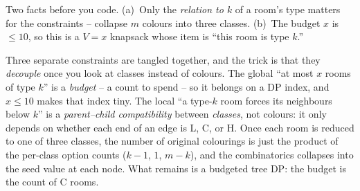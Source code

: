 \begin{attemptgate}
Two facts before you code. (a)~Only the \emph{relation to $k$} of a room's
type matters for the constraints -- collapse $m$ colours into three classes.
(b)~The budget $x$ is $\le 10$, so this is a $V=x$ knapsack whose item is
``this room is type $k$.''
\end{attemptgate}

Three separate constraints are tangled together, and the trick is that they
\emph{decouple} once you look at classes instead of colours. The global
``at most $x$ rooms of type $k$'' is a \emph{budget} -- a count to spend -- so
it belongs on a DP index, and $x \le 10$ makes that index tiny. The local
``a type-$k$ room forces its neighbours below $k$'' is a \emph{parent--child
compatibility} between \emph{classes}, not colours: it only depends on whether
each end of an edge is L, C, or H. Once each room is reduced to one of three
classes, the number of original colourings is just the product of the per-class
option counts ($k{-}1$, $1$, $m{-}k$), and the combinatorics collapses into the
seed value at each node. What remains is a budgeted tree DP: the budget is the
count of C rooms.

